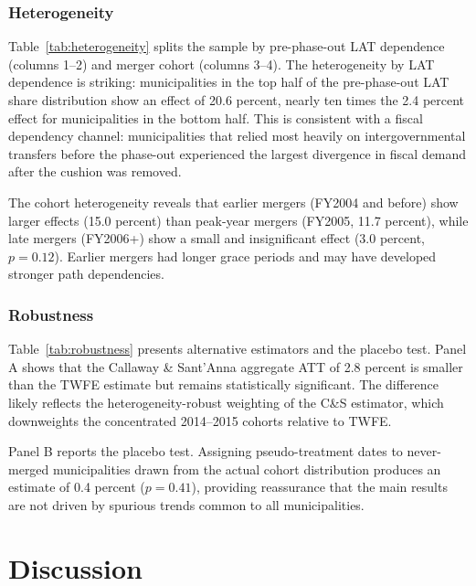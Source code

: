 \documentclass[12pt]{article}
\begin{document}


\subsubsection*{Heterogeneity} Table~\ref{tab:heterogeneity} splits the sample by pre-phase-out LAT dependence (columns 1--2) and merger cohort (columns 3--4). The heterogeneity by LAT dependence is striking: municipalities in the top half of the pre-phase-out LAT share distribution show an effect of 20.6 percent, nearly ten times the 2.4 percent effect for municipalities in the bottom half. This is consistent with a fiscal dependency channel: municipalities that relied most heavily on intergovernmental transfers before the phase-out experienced the largest divergence in fiscal demand after the cushion was removed.

The cohort heterogeneity reveals that earlier mergers (FY2004 and before) show larger effects (15.0 percent) than peak-year mergers (FY2005, 11.7 percent), while late mergers (FY2006+) show a small and insignificant effect (3.0 percent, $p = 0.12$). Earlier mergers had longer grace periods and may have developed stronger path dependencies.



\subsubsection*{Robustness} Table~\ref{tab:robustness} presents alternative estimators and the placebo test. Panel A shows that the Callaway \& Sant'Anna aggregate ATT of 2.8 percent is smaller than the TWFE estimate but remains statistically significant. The difference likely reflects the heterogeneity-robust weighting of the C\&S estimator, which downweights the concentrated 2014--2015 cohorts relative to TWFE.

Panel B reports the placebo test. Assigning pseudo-treatment dates to never-merged municipalities drawn from the actual cohort distribution produces an estimate of 0.4 percent ($p = 0.41$), providing reassurance that the main results are not driven by spurious trends common to all municipalities.



\section{Discussion}
\end{document}
